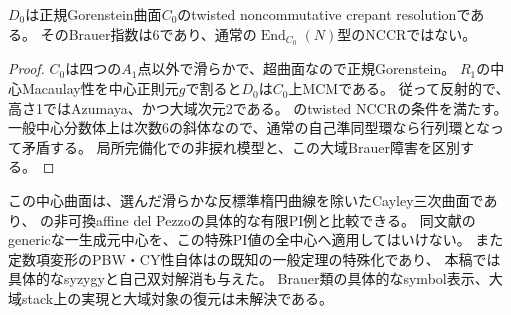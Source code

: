 \begin{corollary}
$D_0$は正規Gorenstein曲面$C_0$のtwisted noncommutative crepant resolutionである。
そのBrauer指数は6であり、通常の$\operatorname{End}_{C_0}(N)$型のNCCRではない。
\end{corollary}
\begin{proof}
$C_0$は四つの$A_1$点以外で滑らかで、超曲面なので正規Gorenstein。
$R_1$の中心Macaulay性を中心正則元$g$で割ると$D_0$は$C_0$上MCMである。
従って反射的で、高さ1ではAzumaya、かつ大域次元2である。
\cite[Definitions~2.1, 2.2]{VdBOverview}のtwisted NCCRの条件を満たす。
一般中心分数体上は次数6の斜体なので、通常の自己準同型環なら行列環となって矛盾する。
局所完備化での非捩れ模型と、この大域Brauer障害を区別する。
\end{proof}
\begin{remark}
この中心曲面は、選んだ滑らかな反標準楕円曲線を除いたCayley三次曲面であり、
\cite[\S1.1, Theorems~3.4.4, 3.4.5]{EGDelPezzo}の非可換affine del Pezzoの具体的な有限PI例と比較できる。
同文献のgenericな一生成元中心を、この特殊PI値の全中心へ適用してはいけない。
また定数項変形のPBW・CY性自体は\cite[Theorem~3.3.2]{EGDelPezzo}の既知の一般定理の特殊化であり、
本稿では具体的なsyzygyと自己双対解消も与えた。
Brauer類の具体的なsymbol表示、大域stack上の実現と大域対象の復元は未解決である。
\end{remark}

